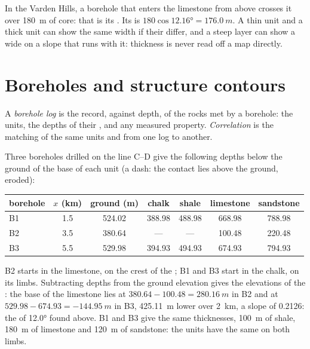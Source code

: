 In the Varden Hills, a borehole that enters the limestone from above crosses it over
\qty{180}{m} of core: that is its . Its  is
$180\cos\ang{12.16} = \qty{176.0}{m}$. A thin unit and a thick unit can show
the same  width if their  differ, and a steep layer can show a
wide  on a slope that runs with it: thickness is never read off a
map directly.

\section{Boreholes and structure contours}\label{sec:b1:cross-sections:boreholes}

\begin{definition}\label{def:b1:cross-sections:log}
A \emph{borehole log} is the record, against depth, of
the rocks met by a borehole: the units, the depths of their , and
any measured property. \emph{Correlation} is
the matching of the same units and  from one log to another.
\end{definition}

Three boreholes drilled on the line C--D give the following depths below the
ground of the base of each unit (a dash: the contact lies above the ground,
eroded):
\begin{center}
\small
\begin{tabular}{lcccccc}
\hline
borehole & $x$ (km) & ground (m) & chalk & shale & limestone & sandstone \\
\hline
B1 & 1.5 & 524.02 & 388.98 & 488.98 & 668.98 & 788.98 \\
B2 & 3.5 & 380.64 & --- & --- & 100.48 & 220.48 \\
B3 & 5.5 & 529.98 & 394.93 & 494.93 & 674.93 & 794.93 \\
\hline
\end{tabular}
\end{center}
B2 starts in the limestone, on the crest of the ; B1 and B3 start in
the chalk, on its limbs. Subtracting depths from the ground elevation gives
the elevations of the : the base of the limestone lies at
$380.64 - 100.48 = \qty{280.16}{m}$ in B2 and at $529.98 - 674.93 =
\qty{-144.95}{m}$ in B3, \qty{425.11}{m} lower over \qty{2}{km}, a slope of
\num{0.2126}: the  of \ang{12.0} found above. B1 and B3 give the
same thicknesses, \qty{100}{m} of shale, \qty{180}{m} of limestone and
\qty{120}{m} of sandstone: the units have the same  on
both limbs.

